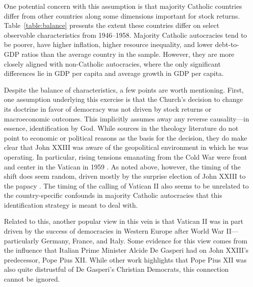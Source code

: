 One potential concern with this assumption is that majority Catholic countries differ from other countries along some dimensions important for stock returns. Table~\ref{table:balance} presents the extent these countries differ on select observable characteristics from 1946--1958. Majority Catholic autocracies tend to be poorer, have higher inflation, higher resource inequality, and lower debt-to-GDP ratios than the average country in the sample. However, they are more closely aligned with non-Catholic autocracies, where the only significant differences lie in GDP per capita and average growth in GDP per capita.

Despite the balance of characteristics, a few points are worth mentioning. First, one assumption underlying this exercise is that the Church's decision to change its doctrine in favor of democracy was not driven by stock returns or macroeconomic outcomes. This implicitly assumes away any reverse causality---in essence, identification by God. While sources in the theology literature do not point to economic or political reasons as the basis for the decision,  they do make clear that John XXIII was aware of the geopolitical environment in which he was operating. In particular, rising tensions emanating from the Cold War were front and center in the Vatican in 1959 \citep{Alberigo2005}.  As noted above, however, the timing of the shift does seem random, driven mostly by the surprise election of John XXIII to the papacy \citep{Alberigo2005,Andersen2019}. The timing of the calling of Vatican II also seems to be unrelated to the country-specific confounds in majority Catholic autocracies that this identification strategy is meant to deal with. 

\label{par:acknowledge_west_europe}
Related to this, another popular view in this vein is that Vatican II was in part driven by the success of democracies in Western Europe after World War II---particularly Germany, France, and Italy. Some evidence for this view comes from the influence that Italian Prime Minister Alcide De Gasperi had on John XXIII's predecessor, Pope Pius XII. While other work highlights that Pope Pius XII was also quite distrustful of De Gasperi's Christian Democrats, this connection cannot be ignored.

